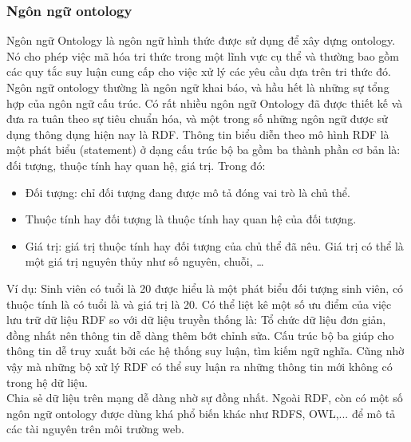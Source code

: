 \subsubsection{Ngôn ngữ ontology}
Ngôn ngữ Ontology là ngôn ngữ hình thức được sử dụng để xây dựng ontology. Nó cho phép việc mã hóa tri thức trong một lĩnh vực cụ thể và thường bao gồm các quy tắc suy luận cung cấp cho việc xử lý các yêu cầu dựa trên tri thức đó. Ngôn ngữ ontology thường là ngôn ngữ khai báo, và hầu hết là những sự tổng hợp của ngôn ngữ cấu trúc. Có rất nhiều ngôn ngữ Ontology đã được thiết kế và đưa ra tuân theo sự tiêu chuẩn hóa, và một trong số những ngôn ngữ được sử dụng thông dụng hiện nay là RDF. Thông tin biểu diễn theo mô hình RDF là một phát biểu (statement) ở dạng cấu trúc bộ ba gồm ba thành phần cơ bản là: đối tượng, thuộc tính hay quan hệ, giá trị. Trong đó:
\begin{itemize}
	\item Đối tượng: chỉ đối tượng đang được mô tả đóng vai trò là chủ thể.
	\item Thuộc tính hay đối tượng là thuộc tính hay quan hệ của đối tượng.
	\item Giá trị: giá trị thuộc tính hay đối tượng của chủ thể đã nêu. Giá trị có thể là một giá trị nguyên thủy như số nguyên, chuỗi, …
\end{itemize}
Ví dụ: Sinh viên có tuổi là 20 được hiểu là một phát biểu đối tượng sinh viên, có thuộc tính là có tuổi là và giá trị là 20.
Có thể liệt kê một số ưu điểm của việc lưu trữ dữ liệu RDF so với dữ liệu truyền thống là: 
Tổ chức dữ liệu đơn giản, đồng nhất nên thông tin dễ dàng thêm bớt chỉnh sửa.
Cấu trúc bộ ba giúp cho thông tin dễ truy xuất bởi các hệ thống suy luận, tìm kiếm ngữ nghĩa. Cũng nhờ vậy mà những bộ xử lý RDF có thể suy luận ra những thông tin mới không có trong hệ dữ liệu. \\
Chia sẻ dữ liệu trên mạng dễ dàng nhờ sự đồng nhất. Ngoài RDF, còn có một số ngôn ngữ ontology được dùng khá phổ biến khác như RDFS, OWL,... để mô tả các tài nguyên trên môi trường web.
